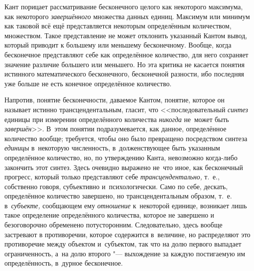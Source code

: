 Кант порицает рассматривание бесконечного целого как некоторого максимума, как
некоторого {\em завершённого} множества данных единиц. Максимум или минимум как
таковой всё ещё представляется некоторым определённым количеством, множеством.
Такое представление не может отклонить указанный Кантом вывод, который приводит
к большему или меньшему бесконечному. Вообще, когда бесконечное представляют
себе как определённое количество, для него сохраняет значение различие большего
или меньшего. Но эта критика не касается понятия истинного математического
бесконечного, бесконечной разности, ибо последняя уже больше не есть конечное
определённое количество.

Напротив, понятие бесконечности, даваемое Кантом, понятие, которое он называет
истинно трансцендентальным, гласит, что <<последовательный {\em синтез} единицы
при измерении определённого количества {\em никогда} не~может быть
{\em завершён}>>. В~этом понятии подразумевается, как данное, определённое
количество вообще; требуется, чтобы оно было превращено посредством синтеза
{\em единицы} в~некоторую численность, в~долженствующее быть указанным
определённое количество, но, по утверждению Канта, невозможно когда-либо
закончить этот синтез. Здесь очевидно выражено не~что иное, как бесконечный
прогресс, который только представляют себе {\em трансцендентально,} т.~е.,
собственно говоря, субъективно и~психологически. Само по себе, дескать,
определённое количество завершено, но трансцендентальным образом, т.~е.
в~{\em субъекте,} сообщающем ему {\em отношение} к~некоторой единице, возникает
лишь такое определение определённого количества, которое не завершено и
безоговорочно обременено потусторонним. Следовательно, здесь вообще застревают
в противоречии, которое содержится в~величине, но распределяют это противоречие
между объектом и~субъектом, так что на долю первого выпадает ограниченность,
а~на долю второго "--- выхождение за каждую постигаемую им
определённость, в~дурное бесконечное.


